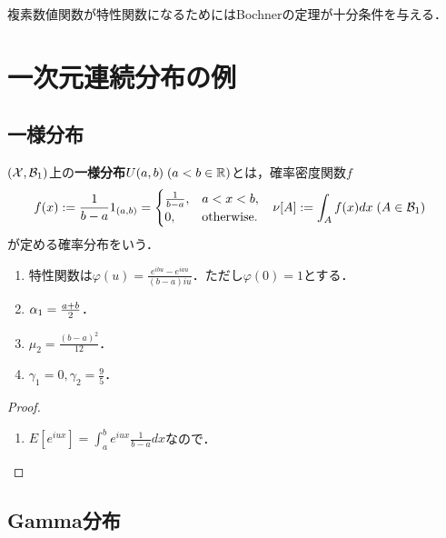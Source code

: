 \documentclass[uplatex,dvipdfmx]{jsreport}
\begin{document}
\begin{tcolorbox}[colframe=ForestGreen, colback=ForestGreen!10!white,breakable,colbacktitle=ForestGreen!40!white,coltitle=black,fonttitle=\bfseries\sffamily,
title=]
    複素数値関数が特性関数になるためにはBochnerの定理が十分条件を与える．
\end{tcolorbox}

\section{一次元連続分布の例}

\subsection{一様分布}

\begin{definition}
    $(\mathcal{X},\mathcal{B}_1)$上の\textbf{一様分布}$U(a,b)\;(a<b\in\mathbb{R})$とは，確率密度関数$f$
    \begin{align*}
        f(x)&:=\frac{1}{b-a}1_{(a,b)}=\begin{cases}
            \frac{1}{b-a},&a<x<b,\\
            0,&\mathrm{otherwise}.
        \end{cases}&\nu[A]&:=\int_Af(x)dx\;(A\in\mathcal{B}_1)
    \end{align*}
    が定める確率分布をいう．
\end{definition}

\begin{proposition}\mbox{}
    \begin{enumerate}
        \item 特性関数は$\varphi(u)=\frac{e^{ibu}-e^{iau}}{(b-a)iu}$．ただし$\varphi(0)=1$とする．
        \item $\alpha_1=\frac{a+b}{2}$．
        \item $\mu_2=\frac{(b-a)^2}{12}$．
        \item $\gamma_1=0,\gamma_2=\frac{9}{5}$．
    \end{enumerate}
\end{proposition}
\begin{proof}\mbox{}
    \begin{enumerate}
        \item $E[e^{iux}]=\int^b_ae^{iux}\frac{1}{b-a}dx$なので．
    \end{enumerate}
\end{proof}

\subsection{Gamma分布}
\end{document}
